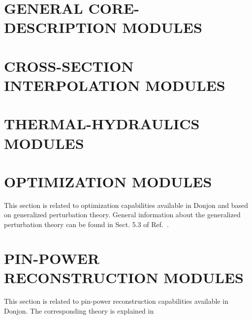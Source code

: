 \section{GENERAL CORE-DESCRIPTION MODULES}\label{sect:modesc1}


\vskip 1.0cm

\vskip 1.0cm

\vskip 1.0cm

\vskip 1.0cm

\vskip 1.0cm

\vskip 1.0cm

\vskip 1.0cm

\vskip 1.0cm

\vskip 1.0cm

\vskip 1.0cm

\vskip 1.0cm

\vskip 1.0cm

\vskip 1.0cm

\vskip 1.0cm

\vskip 1.0cm

\vskip 1.0cm

\vskip 1.0cm


\section{CROSS-SECTION INTERPOLATION MODULES}\label{sect:modesc2}


\vskip 1.0cm

\vskip 1.0cm

\vskip 1.0cm

\vskip 1.0cm

\vskip 1.0cm

\vskip 1.0cm

\section{THERMAL-HYDRAULICS MODULES}\label{sect:modesc3}



\section{OPTIMIZATION MODULES}\label{sect:modesc4}

This section is related to optimization capabilities available in Donjon and
based on generalized perturbation theory.\cite{optex1,optex2} General information
about the generalized perturbation theory can be found in Sect. 5.3 of Ref.~.


\vskip 1.0cm

\vskip 1.0cm


\section{PIN-POWER RECONSTRUCTION MODULES}\label{sect:modesc5}

This section is related to pin-power reconstruction capabilities available in Donjon.
The corresponding theory is explained in \cite{Chambon2014,Fliscounakis2011} 



